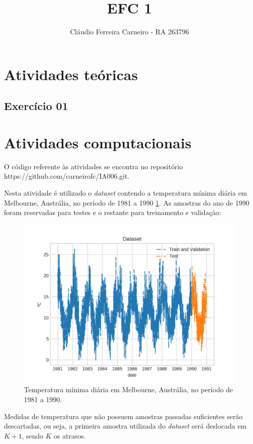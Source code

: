 \documentclass{article}
\author{Cláudio Ferreira Carneiro - RA 263796}
\title{EFC 1}
\begin{document}
    \maketitle
    \newpage
    \section[]{Atividades teóricas}
    \subsection[]{Exercício 01}

    \section[]{Atividades computacionais}
    O código referente às atividades se encontra no repositório https://github.com/carneirofc/IA006.git.

    Nesta atividade é utilizado o \textit{dataset} contendo a temperatura mínima
    diária em Melbourne, Austrália, no período de 1981 a 1990 \ref{fig:dataset}. As amostras do ano
    de 1990 foram reservadas para testes e o restante para treinamento e validação:
    \begin{figure}[!h]
        \centering
        \includegraphics[width=\linewidth]{ex01/dataset.png}
        \caption{Temperatura mínima diária em Melbourne, Austrália, no período de 1981 a 1990.}
        \label{fig:dataset}
    \end{figure}
    
    Medidas de temperatura que não possuem amostras passadas suficientes serão descartadas, ou seja,
    a primeira amostra utilizada do \textit{dataset} será deslocada em $K + 1$, sendo $K$ os atrasos.
\end{document}
